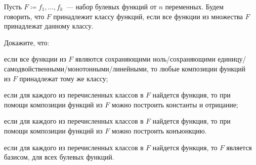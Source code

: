 Пусть $F \coloneqq {f_1, \dots, f_k}$~--- набор булевых функций от $n$ переменных. Будем говорить, что
$F$ принадлежит классу функций, если все функции из множества $F$ принадлежат данному классу.

Докажите, что:
\begin{enumcyr}
    \item если все функции из $F$ являются сохраняющими ноль/сохраняющими
        единицу/самодвойственными/монотонными/линейными, то любые композиции функций из $F$ принадлежат
        тому же классу;
    \item если для каждого из перечисленных классов в $F$ найдется функция, то при помощи композиции
        функций из $F$ можно построить константы и отрицание;
    \item если для каждого из перечисленных классов в $F$ найдется функция, то при помощи композиции
        функций из $F$ можно построить конъюнкцию.
    \item если для каждого из перечисленных классов в $F$ найдется функция, то $F$ является базисом, для
        всех булевых функций.
\end{enumcyr}